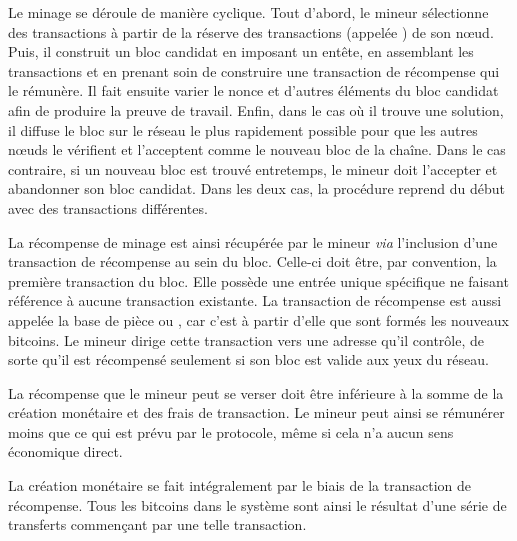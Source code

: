 Le minage se déroule de manière cyclique. Tout d'abord, le mineur sélectionne des transactions à partir de la réserve des transactions (appelée ) de son nœud. Puis, il construit un bloc candidat en imposant un entête, en assemblant les transactions et en prenant soin de construire une transaction de récompense qui le rémunère. Il fait ensuite varier le nonce et d'autres éléments du bloc candidat afin de produire la preuve de travail. Enfin, dans le cas où il trouve une solution, il diffuse le bloc sur le réseau le plus rapidement possible pour que les autres nœuds le vérifient et l'acceptent comme le nouveau bloc de la chaîne. Dans le cas contraire, si un nouveau bloc est trouvé entretemps, le mineur doit l'accepter et abandonner son bloc candidat. Dans les deux cas, la procédure reprend du début avec des transactions différentes.

La récompense de minage est ainsi récupérée par le mineur \emph{via} l'inclusion d'une transaction de récompense au sein du bloc. Celle-ci doit être, par convention, la première transaction du bloc. Elle possède une entrée unique spécifique ne faisant référence à aucune transaction existante. La transaction de récompense est aussi appelée la base de pièce ou , car c'est à partir d'elle que sont formés les nouveaux bitcoins. Le mineur dirige cette transaction vers une adresse qu'il contrôle, de sorte qu'il est récompensé seulement si son bloc est valide aux yeux du réseau.

La récompense que le mineur peut se verser doit être inférieure à la somme de la création monétaire et des frais de transaction. Le mineur peut ainsi se rémunérer moins que ce qui est prévu par le protocole, même si cela n'a aucun sens économique direct.


La création monétaire se fait intégralement par le biais de la transaction de récompense. Tous les bitcoins dans le système sont ainsi le résultat d'une série de transferts commençant par une telle transaction.


